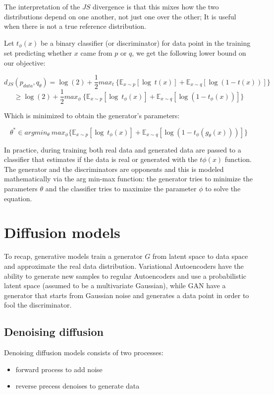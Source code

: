 \documentclass{article}
\begin{document}
The interpretation of the \(JS\) divergence is that this mixes how the
two distributions depend on one another, not just one over the other; It
is useful when there is not a true reference distribution.

Let \(t_\phi (x)\) be a binary classifier (or discriminator) for data
point in the training set predicting whether \(x\) came from \(p\) or
\(q\), we get the following lower bound on our objective:

\[d_{JS}(p_{data}, q_\theta)=\log(2)+\frac{1}{2}max_t\ \{ \mathbb{E}_{x\sim p}[\log\ t(x)] + \mathbb{E}_{x\sim q}[\log(1-t(x))] \}\]
\[\ge \log(2)+\frac{1}{2}max_\phi \ \{ \mathbb{E}_{x\sim p}[\log\ t_\phi(x)] + \mathbb{E}_{x\sim q}[\log(1-t_\phi(x))] \}\]

Which is minimized to obtain the generator's parameters:

\[\theta^* \in argmin_\theta\ max_\phi \{ \mathbb{E}_{x\sim p}[\log\ t_\phi(x)] + \mathbb{E}_{x\sim q}[\log(1-t_\phi(g_{\theta}(x)))] \}\]

In practice, during training both real data and generated data are
passed to a classifier that estimates if the data is real or generated
with the \(t\phi(x)\) function. The generator and the discriminators are
opponents and this is modeled mathematically via the arg min-max
function: the generator tries to minimize the parameters \(\theta\) and
the classifier tries to maximize the parameter \(\phi\) to solve the
equation.

\section{Diffusion models}\label{diffusion-models}

To recap, generative models train a generator \(G\) from latent space to
data space and approximate the real data distribution. Variational
Autoencoders have the ability to generate new samples to regular
Autoencoders and use a probabilistic latent space (assumed to be a
multivariate Gaussian), while GAN have a generator that starts from
Gaussian noise and generates a data point in order to fool the
discriminator.

\subsection{Denoising diffusion}\label{denoising-diffusion}

Denoising diffusion models consists of two processes:

\begin{itemize}
\tightlist
\item
  forward process to add noise
\item
  reverse precess denoises to generate data
\end{itemize}
\end{document}
